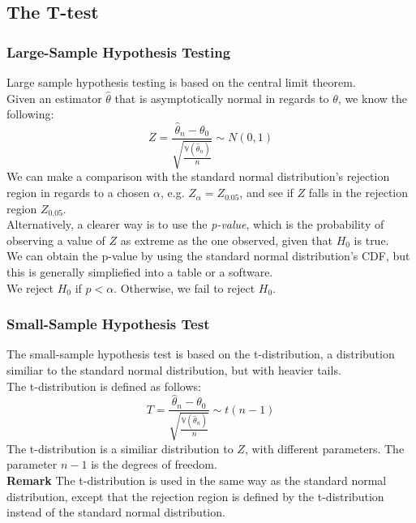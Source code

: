 \documentclass[sn-mathphys,Numbered]{sn-jnl}%
\newcommand{\Var}{\mathbb{V}}
\newcommand{\Remark}{\textbf{Remark }}
\begin{document}
\subsection{The T-test}\label{t-test}
\subsubsection{Large-Sample Hypothesis Testing}\label{large-sample-testing}
Large sample hypothesis testing is based on the central limit theorem. \\ Given
an estimator $\hat \theta$ that is asymptotically normal in regards to
$\theta$, we know the following:
\begin{equation}
    Z = \frac{\hat{\theta}_n - \theta_0}{\sqrt{\frac{\Var(\hat{\theta}_n)}{n}}} \sim N(0, 1)
\end{equation}
We can make a comparison with the standard normal distribution's rejection region in regards to a chosen $\alpha$, e.g. $Z_\alpha = Z_{0.05}$, and see if $Z$ falls in the rejection region $Z_{0.05}$.\\
Alternatively, a clearer way is to use the \textit{p-value}, which is the probability of observing a value of $Z$ as extreme as the one observed, given that $H_0$ is true.\\ We can obtain the p-value by using the standard normal distribution's CDF, but this is generally simpliefied into a table or a software.\\
We reject $H_0$ if $p < \alpha$. Otherwise, we fail to reject $H_0$.

\subsubsection{Small-Sample Hypothesis Test}\label{small-sample-testing}
The small-sample hypothesis test is based on the t-distribution, a distribution
similiar to the standard normal distribution, but with heavier tails.\\ The
t-distribution is defined as follows:
\begin{equation}
    T = \frac{\hat{\theta}_n - \theta_0}{\sqrt{\frac{\Var(\hat{\theta}_n)}{n}}} \sim t(n-1)
\end{equation}
The t-distribution is a similiar distribution to $Z$, with different
parameters. The parameter $n-1$ is the degrees of freedom.\\ \Remark The
t-distribution is used in the same way as the standard normal distribution,
except that the rejection region is defined by the t-distribution instead of
the standard normal distribution.
\end{document}
